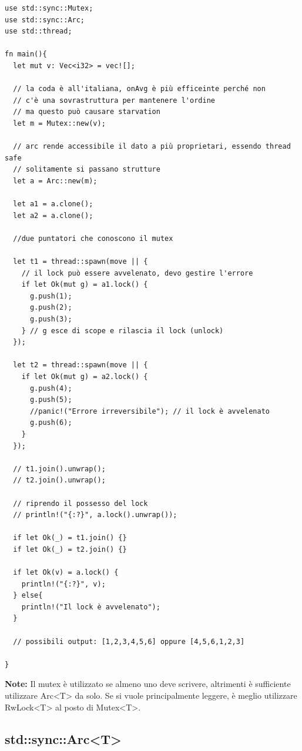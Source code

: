 \begin{verbatim}
use std::sync::Mutex;
use std::sync::Arc;
use std::thread;

fn main(){
  let mut v: Vec<i32> = vec![];

  // la coda è all'italiana, onAvg è più efficeinte perché non 
  // c'è una sovrastruttura per mantenere l'ordine
  // ma questo può causare starvation
  let m = Mutex::new(v);

  // arc rende accessibile il dato a più proprietari, essendo thread safe
  // solitamente si passano strutture 
  let a = Arc::new(m);

  let a1 = a.clone();
  let a2 = a.clone();

  //due puntatori che conoscono il mutex

  let t1 = thread::spawn(move || {
    // il lock può essere avvelenato, devo gestire l'errore
    if let Ok(mut g) = a1.lock() {
      g.push(1);
      g.push(2);
      g.push(3);
    } // g esce di scope e rilascia il lock (unlock)
  });

  let t2 = thread::spawn(move || {
    if let Ok(mut g) = a2.lock() {
      g.push(4);
      g.push(5);
      //panic!("Errore irreversibile"); // il lock è avvelenato
      g.push(6);
    }
  });

  // t1.join().unwrap();
  // t2.join().unwrap();

  // riprendo il possesso del lock
  // println!("{:?}", a.lock().unwrap());

  if let Ok(_) = t1.join() {}
  if let Ok(_) = t2.join() {}

  if let Ok(v) = a.lock() {
    println!("{:?}", v);
  } else{
    println!("Il lock è avvelenato");
  }

  // possibili output: [1,2,3,4,5,6] oppure [4,5,6,1,2,3] 

}
\end{verbatim}

\begin{tcolorbox}
  \textbf{Note:} Il mutex è utilizzato se almeno uno deve scrivere, altrimenti è sufficiente utilizzare
  Arc<T> da solo.
  Se si vuole principalmente leggere, è meglio utilizzare RwLock<T> al posto di Mutex<T>.
\end{tcolorbox}



\subsection{std::sync::Arc<T>}


